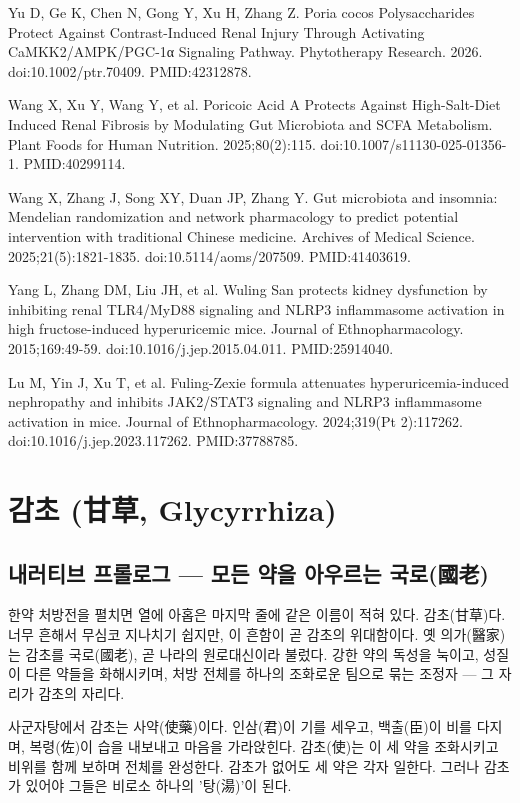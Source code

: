 \documentclass[12pt,oneside]{book}
\newcommand{\refend}{\endgroup\par}
\newcommand{\reff}[2]{\par\hangindent=7mm\hangafter=1\noindent[#1]\hspace{2mm}#2\par}
\begin{document}
\reff{43}{Yu D, Ge K, Chen N, Gong Y, Xu H, Zhang Z. Poria cocos Polysaccharides Protect Against Contrast-Induced Renal Injury Through Activating CaMKK2/AMPK/PGC-1α Signaling Pathway. Phytotherapy Research. 2026. doi:10.1002/ptr.70409. PMID:42312878.}

\reff{44}{Wang X, Xu Y, Wang Y, et al. Poricoic Acid A Protects Against High-Salt-Diet Induced Renal Fibrosis by Modulating Gut Microbiota and SCFA Metabolism. Plant Foods for Human Nutrition. 2025;80(2):115. doi:10.1007/s11130-025-01356-1. PMID:40299114.}

\reff{45}{Wang X, Zhang J, Song XY, Duan JP, Zhang Y. Gut microbiota and insomnia: Mendelian randomization and network pharmacology to predict potential intervention with traditional Chinese medicine. Archives of Medical Science. 2025;21(5):1821-1835. doi:10.5114/aoms/207509. PMID:41403619.}

\reff{46}{Yang L, Zhang DM, Liu JH, et al. Wuling San protects kidney dysfunction by inhibiting renal TLR4/MyD88 signaling and NLRP3 inflammasome activation in high fructose-induced hyperuricemic mice. Journal of Ethnopharmacology. 2015;169:49-59. doi:10.1016/j.jep.2015.04.011. PMID:25914040.}

\reff{47}{Lu M, Yin J, Xu T, et al. Fuling-Zexie formula attenuates hyperuricemia-induced nephropathy and inhibits JAK2/STAT3 signaling and NLRP3 inflammasome activation in mice. Journal of Ethnopharmacology. 2024;319(Pt 2):117262. doi:10.1016/j.jep.2023.117262. PMID:37788785.}

\refend


\chapter{감초 (甘草, Glycyrrhiza)}

\section{내러티브 프롤로그 — 모든 약을 아우르는 국로(國老)}

한약 처방전을 펼치면 열에 아홉은 마지막 줄에 같은 이름이 적혀 있다. 감초(甘草)다. 너무 흔해서 무심코 지나치기 쉽지만, 이 흔함이 곧 감초의 위대함이다. 옛 의가(醫家)는 감초를 국로(國老), 곧 나라의 원로대신이라 불렀다. 강한 약의 독성을 눅이고, 성질이 다른 약들을 화해시키며, 처방 전체를 하나의 조화로운 팀으로 묶는 조정자 — 그 자리가 감초의 자리다.

사군자탕에서 감초는 사약(使藥)이다. 인삼(君)이 기를 세우고, 백출(臣)이 비를 다지며, 복령(佐)이 습을 내보내고 마음을 가라앉힌다. 감초(使)는 이 세 약을 조화시키고 비위를 함께 보하며 전체를 완성한다. 감초가 없어도 세 약은 각자 일한다. 그러나 감초가 있어야 그들은 비로소 하나의 '탕(湯)'이 된다.
\end{document}
